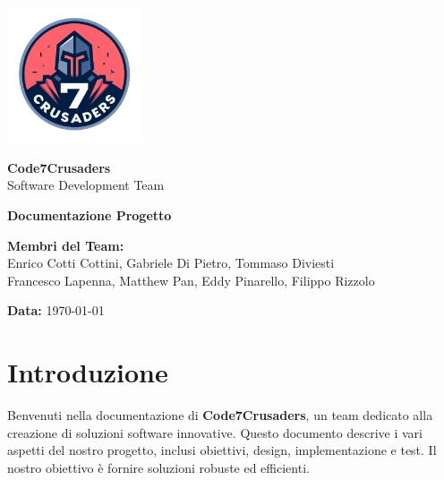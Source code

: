 \documentclass{article}
\begin{document}
\begin{titlepage}

    \centering
    \vspace*{2cm}
    
    \includegraphics[width=0.3\textwidth]{../logo/7Crusaders_logo.png} %
    \vspace{1cm}
    
    {\Huge \textbf{Code7Crusaders}}\\
    \vspace{0.5cm}
    {\Large Software Development Team}\\
    \vspace{2cm}
    
    {\large \textbf{Documentazione Progetto}}\\
    \vspace{0.5cm}
    
    \vfill
    \textbf{Membri del Team:}\\
    Enrico Cotti Cottini, Gabriele Di Pietro, Tommaso Diviesti \\
    Francesco Lapenna, Matthew Pan, Eddy Pinarello, Filippo Rizzolo \\
    \vspace{0.5cm}
    
    {\large \textbf{Data:}} \today\\
    
    \vspace{1cm}
\end{titlepage}

\newpage
\tableofcontents
\newpage

\section{Introduzione}
\label{sec:introduzione}
Benvenuti nella documentazione di \textbf{Code7Crusaders}, un team dedicato alla creazione di soluzioni software innovative. Questo documento descrive i vari aspetti del nostro progetto, inclusi obiettivi, design, implementazione e test. Il nostro obiettivo è fornire soluzioni robuste ed efficienti.
\end{document}
